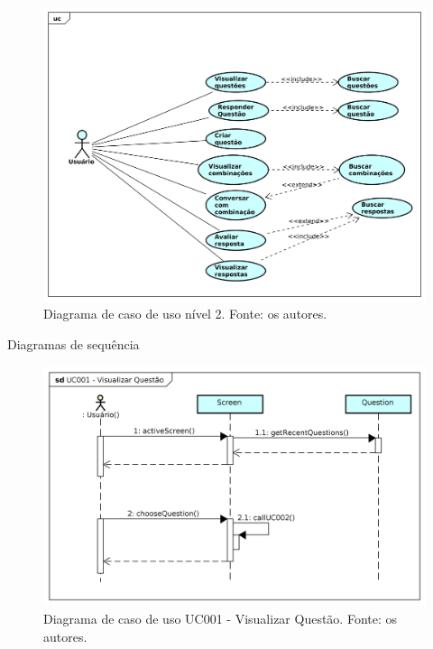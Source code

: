 \begin{figure}[!htb]
\centering
\includegraphics[width=16cm]{DCU2.png}
\caption{Diagrama de caso de uso nível 2. Fonte: os autores.}
\label{fig:DCU2}
\end{figure}

Diagramas de sequência

\begin{figure}[!htb]
\centering
\includegraphics[width=16cm]{UC001-VisualizarQuestao.png}
\caption{Diagrama de caso de uso UC001 - Visualizar Questão. Fonte: os autores.}
\label{fig:UC001}
\end{figure}

